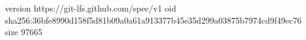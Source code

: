 version https://git-lfs.github.com/spec/v1
oid sha256:36bfe8990d158f5d81b09a0a61a913377b45e35d299a03875b7974cd9f49ec76
size 97665
